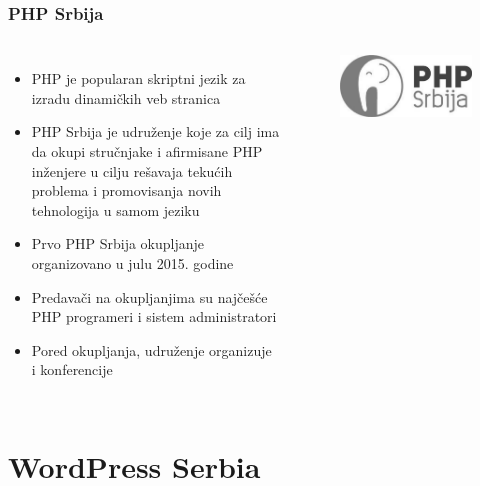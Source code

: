 \documentclass[hyperref={bookmarks=false},aspectratio=169]{beamer}
\begin{document}
\begin{frame}
\frametitle{PHP Srbija}

\begin{columns}[T]

\begin{itemize}
    \item PHP je popularan skriptni jezik za izradu dinamičkih veb stranica 
    \item PHP Srbija je udruženje koje za cilj ima da okupi stručnjake i afirmisane PHP inženjere u cilju rešavaja tekućih problema i promovisanja novih tehnologija u samom jeziku
    \item Prvo PHP Srbija okupljanje organizovano u julu 2015. godine
    \item Predavači na okupljanjima su najčešće PHP programeri i sistem administratori
    \item Pored okupljanja, udruženje organizuje i konferencije
\end{itemize}

\begin{figure}
    \raggedleft
    \includegraphics[scale=0.15]{./images/php_gray.jpg}
\end{figure}

\end{columns}

\end{frame}

\section{WordPress Serbia}
\end{document}
